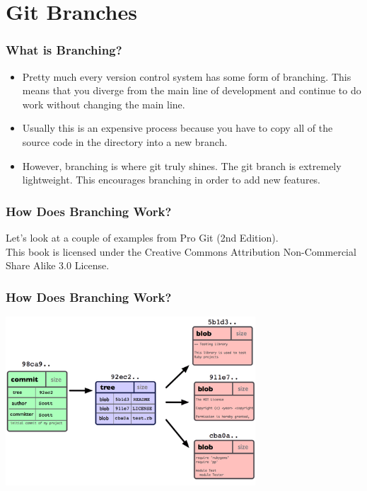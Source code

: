
\section[Branching]{Git Branches}

\begin{frame}
\frametitle{\large What is Branching?}
\begin{itemize}
\item Pretty much every version control system has some form of branching. This means that you diverge from the main line of development and continue to do work without changing the main line.
\pause
\item Usually this is an expensive process because you have to copy all of the source code in the directory into a new branch.
\pause
\item However, branching is where git truly shines. The git branch is extremely lightweight. This encourages branching in order to add new features.
\end{itemize}
\end{frame}

\begin{frame}
\frametitle{\large How Does Branching Work?}
\begin{center}
Let's look at a couple of examples from Pro Git (2nd Edition). \\
This book is licensed under the Creative Commons Attribution Non-Commercial Share Alike 3.0 License.
\end{center}
\end{frame}

\begin{frame}
\frametitle{\large How Does Branching Work?}
\begin{center}
\includegraphics[width=0.7\textwidth]{img/branching_images/fig1.png}
\end{center}
\end{frame}

